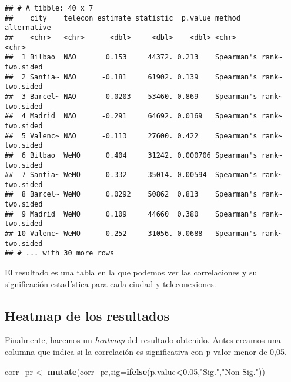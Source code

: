\documentclass[]{article}
\newenvironment{Shaded}{\begin{snugshade}}{\end{snugshade}}
\newcommand{\KeywordTok}[1]{\textcolor[rgb]{0.13,0.29,0.53}{\textbf{#1}}}
\newcommand{\DataTypeTok}[1]{\textcolor[rgb]{0.13,0.29,0.53}{#1}}
\newcommand{\FloatTok}[1]{\textcolor[rgb]{0.00,0.00,0.81}{#1}}
\newcommand{\StringTok}[1]{\textcolor[rgb]{0.31,0.60,0.02}{#1}}
\newcommand{\OperatorTok}[1]{\textcolor[rgb]{0.81,0.36,0.00}{\textbf{#1}}}
\newcommand{\NormalTok}[1]{#1}
\begin{document}
\begin{verbatim}
## # A tibble: 40 x 7
##    city    telecon estimate statistic  p.value method           alternative
##    <chr>   <chr>      <dbl>     <dbl>    <dbl> <chr>            <chr>      
##  1 Bilbao  NAO       0.153     44372. 0.213    Spearman's rank~ two.sided  
##  2 Santia~ NAO      -0.181     61902. 0.139    Spearman's rank~ two.sided  
##  3 Barcel~ NAO      -0.0203    53460. 0.869    Spearman's rank~ two.sided  
##  4 Madrid  NAO      -0.291     64692. 0.0169   Spearman's rank~ two.sided  
##  5 Valenc~ NAO      -0.113     27600. 0.422    Spearman's rank~ two.sided  
##  6 Bilbao  WeMO      0.404     31242. 0.000706 Spearman's rank~ two.sided  
##  7 Santia~ WeMO      0.332     35014. 0.00594  Spearman's rank~ two.sided  
##  8 Barcel~ WeMO      0.0292    50862  0.813    Spearman's rank~ two.sided  
##  9 Madrid  WeMO      0.109     44660  0.380    Spearman's rank~ two.sided  
## 10 Valenc~ WeMO     -0.252     31056. 0.0688   Spearman's rank~ two.sided  
## # ... with 30 more rows
\end{verbatim}

El resultado es una tabla en la que podemos ver las correlaciones y su
significación estadística para cada ciudad y teleconexiones.

\subsection{Heatmap de los resultados}\label{heatmap-de-los-resultados}

Finalmente, hacemos un \emph{heatmap} del resultado obtenido. Antes
creamos una columna que indica si la correlación es significativa con
p-valor menor de 0,05.

\begin{Shaded}
\begin{Highlighting}[]
\NormalTok{corr_pr <-}\StringTok{ }\KeywordTok{mutate}\NormalTok{(corr_pr,}\DataTypeTok{sig=}\KeywordTok{ifelse}\NormalTok{(p.value}\OperatorTok{<}\FloatTok{0.05}\NormalTok{,}\StringTok{"Sig."}\NormalTok{,}\StringTok{"Non Sig."}\NormalTok{))}
\end{Highlighting}
\end{Shaded}
\end{document}
